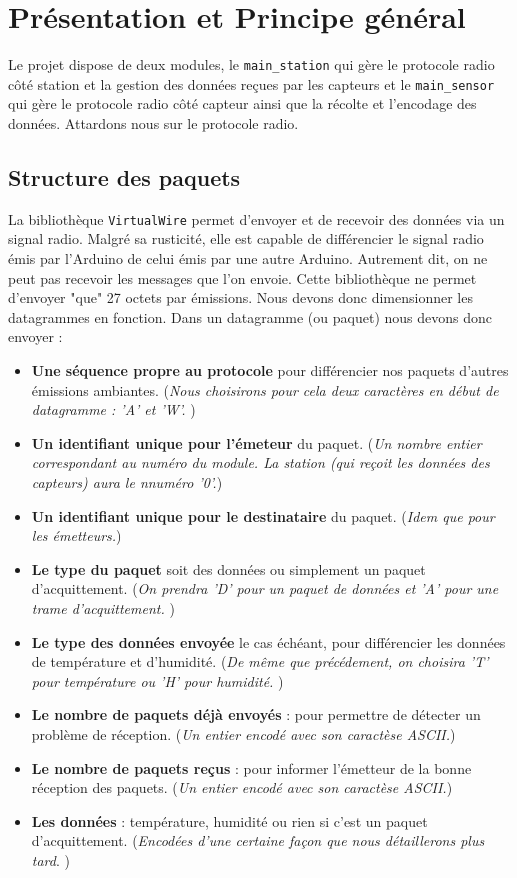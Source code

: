 \documentclass[a4paper]{article}
\begin{document}
\section{Présentation et Principe général}

Le projet dispose de deux modules, le \texttt{main\_station} qui gère le protocole radio côté station et 
la gestion des données reçues par les capteurs et le \texttt{main\_sensor} qui gère le protocole radio côté 
capteur ainsi que la récolte et l'encodage des données. Attardons nous sur le protocole radio. 

\subsection{Structure des paquets}

La bibliothèque \texttt{VirtualWire} permet d'envoyer et de recevoir des données via un signal radio.
Malgré sa rusticité, elle est capable de différencier le signal radio émis par l'Arduino de celui émis par une 
autre Arduino. Autrement dit, on ne peut pas recevoir les messages que l'on envoie. 
Cette bibliothèque ne permet d'envoyer "que" 27 octets par émissions. Nous devons donc dimensionner les datagrammes en fonction. 
Dans un datagramme (ou paquet) nous devons donc envoyer : 
\begin{itemize}
    \item \textbf{Une séquence propre au protocole} pour différencier nos paquets d'autres émissions ambiantes. 
        (\emph{Nous choisirons pour cela deux caractères en début de datagramme : 'A' et 'W'. })
    \item \textbf{Un identifiant unique pour l'émeteur} du paquet. 
        (\emph{Un nombre entier correspondant au numéro du module. La station (qui reçoit les données 
        des capteurs) aura le nnuméro '0'.})
    \item \textbf{Un identifiant unique pour le destinataire} du paquet. 
        (\emph{Idem que pour les émetteurs.})
    \item \textbf{Le type du paquet} soit des données ou simplement un paquet d'acquittement. 
        (\emph{On prendra 'D' pour un paquet de données et 'A' pour une trame d'acquittement. })
    \item \textbf{Le type des données envoyée} le cas échéant, pour différencier les données de température et d'humidité. 
        (\emph{De même que précédement, on choisira 'T' pour température ou 'H' pour humidité. })
    \item \textbf{Le nombre de paquets déjà envoyés} : pour permettre de détecter un problème de réception. 
        (\emph{Un entier encodé avec son caractèse ASCII.})
    \item \textbf{Le nombre de paquets reçus} : pour informer l'émetteur de la bonne réception des paquets. 
        (\emph{Un entier encodé avec son caractèse ASCII.})
    \item \textbf{Les données} : température, humidité ou rien si c'est un paquet d'acquittement. 
        (\emph{Encodées d'une certaine façon que nous détaillerons plus tard}. )
\end{itemize}
\end{document}
